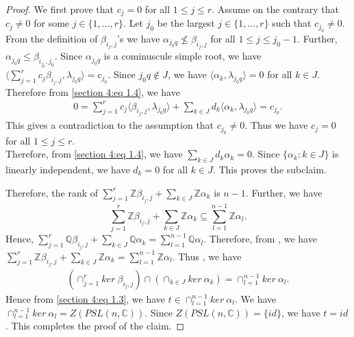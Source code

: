 \documentclass[12pt,reqno]{amsart}
\numberwithin{equation}{section}
\theoremstyle{definition}
\begin{document}
\begin{proof}
We first prove that $c_{j}=0$ for all $1\leq j\leq r$. 
Assume on the contrary that $c_{j}\neq 0$ for some $j\in\{1,\ldots,r\}$. Let $j_{0}$ be the largest $j\in \{1,\ldots,r\}$ such that $c_{j_{0}}\neq 0$. From the definition of $\beta_{i_{j},j}$'s we have $\alpha_{j_{0}q}\nleq\beta_{i_{j},j}$ for all $1\leq j\leq j_{0}-1$. Further, $\alpha_{j_{0}q}\leq \beta_{i_{j_{0}},j_{0}}$. Since $\alpha_{j_{0}q}$ is a cominuscule simple root, we have $\langle\sum_{j=1}^{r}c_{j}\beta_{i_{j},j},\lambda_{j_{0}q}\rangle=c_{j_{0}}$. Since $j_{0}q\notin J$, we have $\langle \alpha_{k},\lambda_{j_{0}q}\rangle=0$ for all $k\in J$. Therefore from \cref{section 4:eq 1.4}, we have \begin{align*}
	0=\sum_{j=1}^{r}c_{j}\langle\beta_{i_{j},j},\lambda_{j_{0}q}\rangle+\sum_{k\in J}d_{k}\langle\alpha_{k},\lambda_{j_{0}q}\rangle=c_{j_{0}}.
\end{align*}
This gives a contradiction to the assumption that $c_{j_{0}}\neq 0$. Thus we have $c_{j}=0$ for all $1\leq j\leq r$.\\
 Therefore, from \cref{section 4:eq 1.4}, we have $\sum_{k\in J}d_{k}\alpha_{k}=0$. Since $\{\alpha_{k}:k\in J\}$ is linearly independent, we have $d_{k}=0$ for all $k\in J$. This proves the subclaim.

Therefore, the rank of $\sum_{j=1}^{r}\mathbb{Z}\beta_{i_{j},j}+\sum_{k\in J}\mathbb{Z}\alpha_{k}$ is $n-1$. Further, we have  $$\sum_{j=1}^{r}\mathbb{Z}\beta_{i_{j},j}+\sum_{k\in J}\mathbb{Z}\alpha_{k}\subseteq\sum_{l=1}^{n-1}\mathbb{Z}\alpha_{l}.$$
Hence, $\sum_{j=1}^{r}\mathbb{Q}\beta_{i_{j},j}+\displaystyle\sum_{k\in J}\mathbb{Q}\alpha_{k}=\sum_{l=1}^{n-1}\mathbb{Q}\alpha_{l}$. Therefore,  from \cite[lemma 3.2, page 193]{Kannan 3}, we have $\sum_{j=1}^{r}\mathbb{Z}\beta_{i_{j},j}+\displaystyle\sum_{k\in J}\mathbb{Z}\alpha_{k}=\sum_{l=1}^{n-1}\mathbb{Z}\alpha_{l}$. Thus , we have \begin{align*}
	(\cap_{j=1}^{r}ker\ \beta_{i_{j},j})\cap(\cap_{k\in J}ker\ \alpha_{k})=\cap_{l=1}^{n-1} ker\ \alpha_{l}.
\end{align*}
Hence from \cref{section 4:eq 1.3}, we have $t\in \cap_{l=1}^{n-1}ker\ \alpha_{l}$. We have $\cap_{l=1}^{n-1}ker\ \alpha_{l}=Z(PSL(n,\mathbb{C}))$. Since $Z(PSL(n,\mathbb{C}))=\{id\}$, we have $t=id$. This completes the proof of the claim.


\end{proof}
\end{document}
